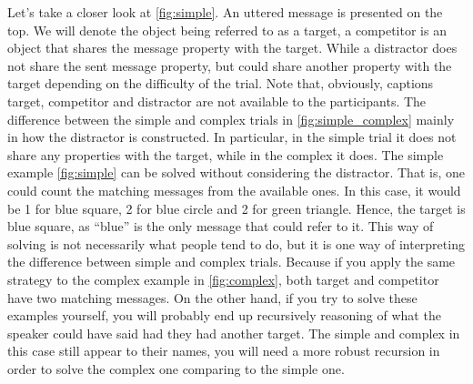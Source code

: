 Let's take a closer look at \autoref{fig:simple}. An uttered message is presented on the top. We will denote the object being referred to as a target, a competitor is an object that shares the message property with the target. While a distractor does not share the sent message property, but could share another property with the target depending on the difficulty of the trial. Note that, obviously, captions target, competitor and distractor are not available to the participants. The difference between the simple and complex trials in \autoref{fig:simple_complex} mainly in how the distractor is constructed. In particular, in the simple trial it does not share any properties with the target, while in the complex it does. The simple example \autoref{fig:simple} can be solved without considering the distractor. That is, one could count the matching messages from the available ones. In this case, it would be 1 for blue square, 2 for blue circle and 2 for green triangle. Hence, the target is blue square, as ``blue'' is the only message that could refer to it. This way of solving is not necessarily what people tend to do, but it is one way of interpreting the difference between simple and complex trials. Because if you apply the same strategy to the complex example in \autoref{fig:complex}, both target and competitor have two matching messages. On the other hand, if you try to solve these examples yourself, you will probably end up recursively reasoning of what the speaker could have said had they had another target. The simple and complex in this case still appear to their names, you will need a more robust recursion in order to solve the complex one comparing to the simple one.

